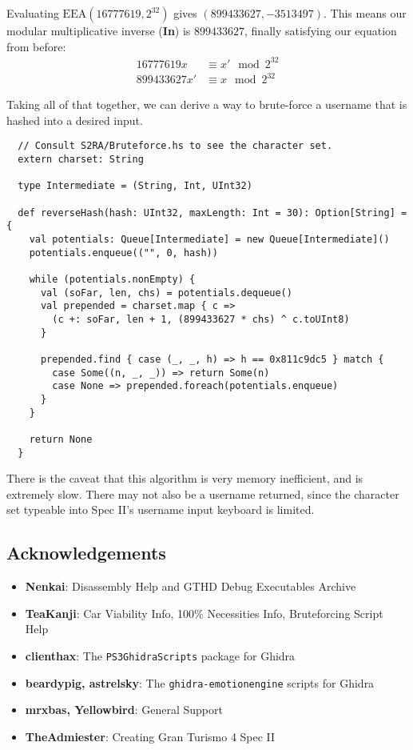 \documentclass[14pt,a4paper,notitlepage]{extarticle}
\begin{document}
                Evaluating $\text{EEA}(16777619, 2^{32})$ gives $(899433627,-3513497)$.
                This means our modular multiplicative inverse (\textbf{In}) is $899433627$, finally
                satisfying our equation from before:
                \begin{align*}
                    16777619x &\equiv x' \mod 2^{32}\\
                    899433627 x' &\equiv x \mod 2^{32}
                \end{align*}

                \noindent Taking all of that together, we can derive a way to brute-force a username
                that is hashed into a desired input.
                \pagebreak
                \begin{lstlisting}
  // Consult S2RA/Bruteforce.hs to see the character set.
  extern charset: String

  type Intermediate = (String, Int, UInt32)

  def reverseHash(hash: UInt32, maxLength: Int = 30): Option[String] = {
    val potentials: Queue[Intermediate] = new Queue[Intermediate]()
    potentials.enqueue(("", 0, hash))

    while (potentials.nonEmpty) {
      val (soFar, len, chs) = potentials.dequeue()
      val prepended = charset.map { c =>
        (c +: soFar, len + 1, (899433627 * chs) ^ c.toUInt8)
      }

      prepended.find { case (_, _, h) => h == 0x811c9dc5 } match {
        case Some((n, _, _)) => return Some(n)
        case None => prepended.foreach(potentials.enqueue)
      }
    }

    return None
  }
                \end{lstlisting}

                \noindent There is the caveat that this algorithm is very memory inefficient, and
                is extremely slow. There may not also be a username returned, since the character
                set typeable into Spec II's username input keyboard is limited.

        \subsection*{Acknowledgements}
            \small{
                \begin{itemize}
                    \item \textbf{Nenkai}: Disassembly Help and GTHD Debug Executables Archive
                    \item \textbf{TeaKanji}: Car Viability Info, 100\% Necessities Info,
                    Bruteforcing Script Help
                    \item \textbf{clienthax}: The \texttt{PS3GhidraScripts} package for Ghidra
                    \item \textbf{beardypig, astrelsky}: The \texttt{ghidra-emotionengine} scripts
                    for Ghidra
                    \item \textbf{mrxbas, Yellowbird}: General Support
                    \item \textbf{TheAdmiester}: Creating Gran Turismo 4 Spec II
                \end{itemize}
            }
\end{document}
